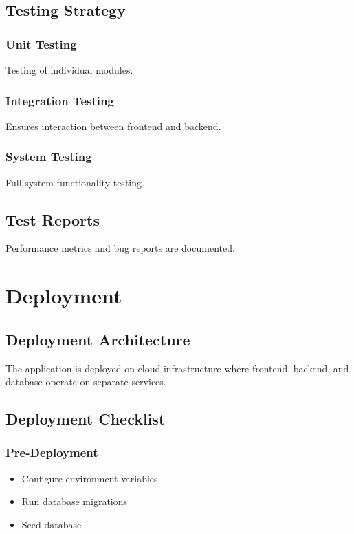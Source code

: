 \documentclass[12pt,a4paper]{report}
\begin{document}
\section{Testing Strategy}

\subsection{Unit Testing}

Testing of individual modules.

\subsection{Integration Testing}

Ensures interaction between frontend and backend.

\subsection{System Testing}

Full system functionality testing.

\section{Test Reports}

Performance metrics and bug reports are documented.

\chapter{Deployment}

\section{Deployment Architecture}

The application is deployed on cloud infrastructure where frontend, backend, and database operate on separate services.

\section{Deployment Checklist}

\subsection{Pre-Deployment}

\begin{itemize}
\item Configure environment variables
\item Run database migrations
\item Seed database
\end{itemize}
\end{document}
